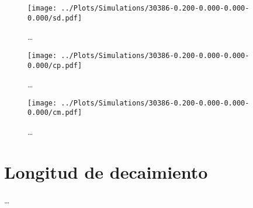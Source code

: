 \begin{figure}
    \centering
    \texttt{[image: ../Plots/Simulations/30386-0.200-0.000-0.000-0.000/sd.pdf]}
    \caption{\dots}
    \label{fig:sd_i}
\end{figure}

\begin{figure}
    \centering
    \texttt{[image: ../Plots/Simulations/30386-0.200-0.000-0.000-0.000/cp.pdf]}
    \caption{\dots}
    \label{fig:cp_i}
\end{figure}

\begin{figure}
    \centering
    \texttt{[image: ../Plots/Simulations/30386-0.200-0.000-0.000-0.000/cm.pdf]}
    \caption{\dots}
    \label{fig:cm_i}
\end{figure}

\section{Longitud de decaimiento}

\dots

